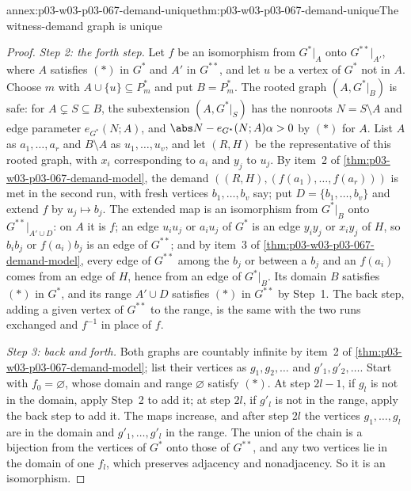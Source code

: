 \begin{annexitem}{annex:p03-w03-p03-067-demand-unique}{thm:p03-w03-p03-067-demand-unique}{The witness-demand graph is unique}
\begin{proof}
\emph{Step 2: the forth step.}  Let \(f\) be an isomorphism from
\(G^\ast|_A\) onto \(G^{\ast\ast}|_{A'}\), where \(A\) satisfies \((\ast)\) in
\(G^\ast\) and \(A'\) in \(G^{\ast\ast}\), and let \(u\) be a vertex of
\(G^\ast\) not in \(A\).  Choose \(m\) with \(A\cup\{u\}\subseteq P^\ast_m\)
and put \(B=P^\ast_m\).  The rooted graph \((A,G^\ast|_B)\) is safe: for
\(A\subsetneq S\subseteq B\), the subextension \((A,G^\ast|_S)\) has the
nonroots \(N=S\setminus A\) and edge parameter \(e_{G^\ast}(N;A)\), and
\(\abs N-e_{G^\ast}(N;A)\alpha>0\) by \((\ast)\) for \(A\).  List \(A\) as
\(a_1,\ldots,a_r\) and \(B\setminus A\) as \(u_1,\ldots,u_v\), and let
\((R,H)\) be the representative of this rooted graph, with \(x_i\)
corresponding to \(a_i\) and \(y_j\) to \(u_j\).  By item~2 of
\cref{thm:p03-w03-p03-067-demand-model}, the demand
\(((R,H),(f(a_1),\ldots,f(a_r)))\) is met in the second run, with fresh
vertices \(b_1,\ldots,b_v\) say; put \(D=\{b_1,\ldots,b_v\}\) and extend
\(f\) by \(u_j\mapsto b_j\).  The extended map is an isomorphism from
\(G^\ast|_B\) onto \(G^{\ast\ast}|_{A'\cup D}\): on \(A\) it is \(f\); an
edge \(u_iu_j\) or \(a_iu_j\) of \(G^\ast\) is an edge \(y_iy_j\) or
\(x_iy_j\) of \(H\), so \(b_ib_j\) or \(f(a_i)b_j\) is an edge of
\(G^{\ast\ast}\); and by item~3 of
\cref{thm:p03-w03-p03-067-demand-model}, every edge of \(G^{\ast\ast}\) among
the \(b_j\) or between a \(b_j\) and an \(f(a_i)\) comes from an edge of
\(H\), hence from an edge of \(G^\ast|_B\).  Its domain \(B\) satisfies
\((\ast)\) in \(G^\ast\), and its range \(A'\cup D\) satisfies \((\ast)\) in
\(G^{\ast\ast}\) by Step~1.  The back step, adding a given vertex of
\(G^{\ast\ast}\) to the range, is the same with the two runs exchanged and
\(f^{-1}\) in place of \(f\).

\emph{Step 3: back and forth.}  Both graphs are countably infinite by item~2
of \cref{thm:p03-w03-p03-067-demand-model}; list their vertices as
\(g_1,g_2,\ldots\) and \(g'_1,g'_2,\ldots\).  Start with \(f_0=\varnothing\),
whose domain and range \(\varnothing\) satisfy \((\ast)\).  At step
\(2l-1\), if \(g_l\) is not in the domain, apply Step~2 to add it; at step
\(2l\), if \(g'_l\) is not in the range, apply the back step to add it.  The
maps increase, and after step \(2l\) the vertices \(g_1,\ldots,g_l\) are in
the domain and \(g'_1,\ldots,g'_l\) in the range.  The union of the chain is
a bijection from the vertices of \(G^\ast\) onto those of \(G^{\ast\ast}\),
and any two vertices lie in the domain of one \(f_l\), which preserves
adjacency and nonadjacency.  So it is an isomorphism.
\end{proof}
\end{annexitem}

